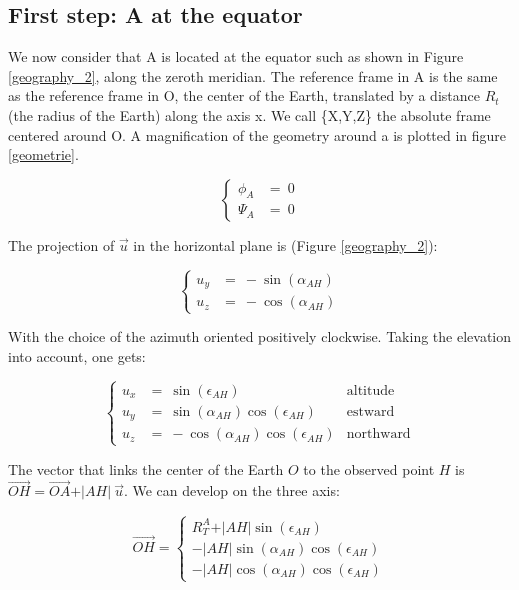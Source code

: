 \documentclass[draft,jgrga]{agutexSI}
\begin{document}
\begin{article}
\section{First step: A at the equator}
We now consider that A is located at the equator such as shown in Figure \ref{geography_2}, along the zeroth meridian. The reference frame in A is the same as the reference frame in O, the center of the Earth, translated by a distance $R_t$ (the radius of the Earth) along the axis x. We call \{X,Y,Z\} the absolute frame centered around O. A magnification of the geometry around a is plotted in figure \ref{geometrie}.

\begin{equation}
\left\{ \begin{array}{cc}
\phi_{A} &=\ 0 \\
\Psi_{A} &=\ 0 
\end{array} \right.
\label{coord_eq}
\end{equation}

The projection of $\overrightarrow{u}$ in the horizontal plane is (Figure \ref{geography_2}):

\begin{equation}
\left\{ \begin{array}{cc}
u_y &=\ -\sin(\alpha_{AH}) \\
u_z &=\ -\cos(\alpha_{AH}) 
\end{array} \right.
\label{vect_eq}
\end{equation}

With the choice of the azimuth oriented positively clockwise. Taking the elevation into account, one gets:

\begin{equation}
\left\{ \begin{array}{ccc}
u_x &=\ \sin(\epsilon_{AH}) & \textrm{altitude} \\
u_y &=\ \sin(\alpha_{AH})\cos(\epsilon_{AH})& \textrm{estward} \\
u_z &=\ -\cos(\alpha_{AH}) \cos(\epsilon_{AH})& \textrm{northward}
\end{array} \right.
\label{vect_eq_proj}
\end{equation}

The vector that links the center of the Earth $O$ to the observed point $H$ is $\overrightarrow{OH}=\overrightarrow{OA} + \vert AH \vert \ \overrightarrow{u}$. We can develop on the three axis:

\begin{equation}
\overrightarrow{OH}=\left\{ \begin{array}{c}
R_T^A+\vert AH \vert\sin(\epsilon_{AH})\\
-\vert AH \vert\sin(\alpha_{AH})\cos(\epsilon_{AH}) \\
-\vert AH \vert\cos(\alpha_{AH}) \cos(\epsilon_{AH})
\end{array} \right.
\end{equation}


\end{article}
\end{document}
